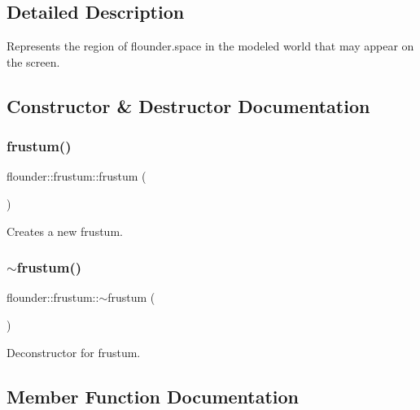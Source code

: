 \subsection{Detailed Description}
Represents the region of flounder.\+space in the modeled world that may appear on the screen. 



\subsection{Constructor \& Destructor Documentation}
\mbox{\label{classflounder_1_1frustum_a35fc0f2d80ba8f057abf39dadabb5a45}} 
\subsubsection{\texorpdfstring{frustum()}{frustum()}}
{\footnotesize\ttfamily flounder\+::frustum\+::frustum (\begin{DoxyParamCaption}{ }\end{DoxyParamCaption})}



Creates a new frustum. 

\mbox{\label{classflounder_1_1frustum_a4496169c4a40c7d68447a3d1197e7fb4}} 
\subsubsection{\texorpdfstring{$\sim$frustum()}{~frustum()}}
{\footnotesize\ttfamily flounder\+::frustum\+::$\sim$frustum (\begin{DoxyParamCaption}{ }\end{DoxyParamCaption})}



Deconstructor for frustum. 



\subsection{Member Function Documentation}
\mbox{\label{classflounder_1_1frustum_a93a76dc0315351105d4ced1c28e12994}} 
